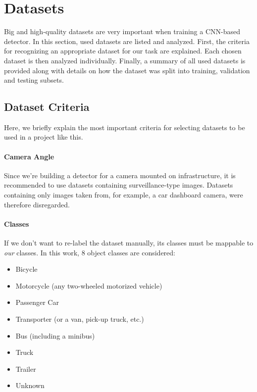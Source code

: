 



\chapter{Datasets}
\label{DatasetsChapter}

Big and high-quality datasets are very important when training a CNN-based
detector. In this section, used datasets are listed and analyzed. First, the
criteria for recognizing an appropriate dataset for our task are explained. Each
chosen dataset is then analyzed individually. Finally, a summary of all used
datasets is provided along with details on how the dataset was split into
training, validation and testing subsets.


\section{Dataset Criteria}


Here, we briefly explain the most important criteria for selecting datasets to
be used in a project like this.

\subsubsection*{Camera Angle}

Since we're building a detector for a camera mounted on infrastructure, it is
recommended to use datasets containing surveillance-type images. Datasets
containing only images taken from, for example, a car dashboard camera, were
therefore disregarded.

\subsubsection*{Classes}
\label{Classes}

If we don't want to re-label the dataset manually, its classes must be mappable
to \textit{our} classes. In this work, 8 object classes are considered:
\begin{itemize}
    \item Bicycle
    \item Motorcycle (any two-wheeled motorized vehicle)
    \item Passenger Car
    \item Transporter (or a van, pick-up truck, etc.)
    \item Bus (including a minibus)
    \item Truck
    \item Trailer
    \item Unknown
\end{itemize}

